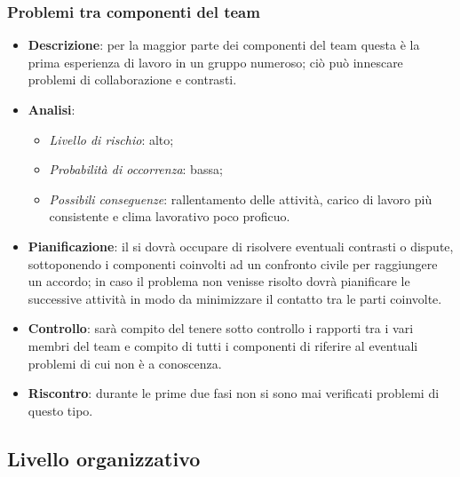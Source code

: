 		\subsubsection{Problemi tra componenti del team}
			\begin{itemize}
				\item \textbf{Descrizione}: per la maggior parte dei componenti del team questa è la prima esperienza di lavoro in un gruppo numeroso; ciò può  innescare problemi di collaborazione e contrasti.
				\item \textbf{Analisi}:
				\begin{itemize}
					\item \textit{Livello di rischio}: alto;
					\item \textit{Probabilità di occorrenza}: bassa;
					\item \textit{Possibili conseguenze}: rallentamento delle attività, carico di lavoro più consistente e clima lavorativo poco proficuo.
				\end{itemize}
				\item \textbf{Pianificazione}: il  si dovrà occupare di risolvere eventuali contrasti o dispute, sottoponendo i componenti coinvolti ad un confronto civile per raggiungere un accordo; in caso il problema non venisse risolto dovrà pianificare le successive attività in modo da minimizzare il contatto tra le parti coinvolte.
				\item \textbf{Controllo}: sarà compito del  tenere sotto controllo i rapporti tra i vari membri del team e compito di tutti i componenti di riferire al  eventuali problemi di cui non è a conoscenza.
				\item \textbf{Riscontro}: durante le prime due fasi non si sono mai verificati problemi di questo tipo.
			\end{itemize}
	\subsection{Livello organizzativo}
